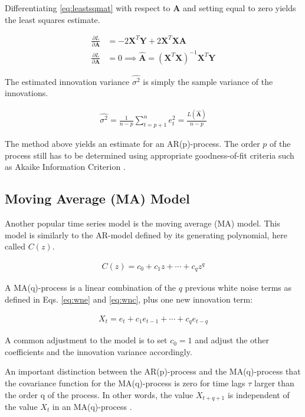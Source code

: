 Differentiating \ref{eq:leastsqmat} with respect to $\mathbf{A}$ and setting equal to zero yields the least squares estimate. 

\begin{align}
    \frac{\partial L}{\partial \mathbf{A}} &= -2 \mathbf{X}^T \mathbf{Y} + 2\mathbf{X}^T \mathbf{X} \mathbf{A} \\
    \frac{\partial L}{\partial \mathbf{A}} &= 0 \implies \hat{\mathbf{A}} = (\mathbf{X}^T \mathbf{X})^{-1} \mathbf{X}^T \mathbf{Y}
 \end{align}

The estimated innovation variance $\hat{\sigma^2}$ is simply the sample variance of the innovations.

\begin{align}
    \hat{\sigma^2} =\frac{1}{n-p} \sum_{t=p+1}^n e_t^2 = \frac{L(\hat{\mathbf{A}})}{n-p}
\end{align}

The method above yields an estimate for an AR(p)-process. The order $p$ of the process still has to be determined using appropriate goodness-of-fit criteria such as Akaike Information Criterion \citep{lindgren2014stationary}. 



\subsection{Moving Average (MA) Model}

Another popular time series model is the moving average (MA) model. This model is similarly to the AR-model defined by its generating polynomial, here called $C(z)$. 

\begin{align}
    C(z) = c_0 + c_1 z + \cdots + c_q z^q 
\end{align}

A MA(q)-process is a linear combination of the $q$ previous white noise terms as defined in Eqs. \ref{eq:wne} and \ref{eq:wnc}, plus one new innovation term:

\begin{align}
    X_t = e_t + c_1 e_{t-1} + \cdots + c_q e_{t-q}
\end{align}

A common adjustment to the model is to set $c_0 = 1$ and adjust the other coefficients and the innovation variance accordingly. 

An important distinction between the AR(p)-process and the MA(q)-process that the covariance function for the MA(q)-process is zero for time lags $\tau$ larger than the order q of the process. In other words, the value $X_{t+q + 1}$ is independent of the value $X_t$ in an MA(q)-process \citep{lindgren2014stationary}. 

